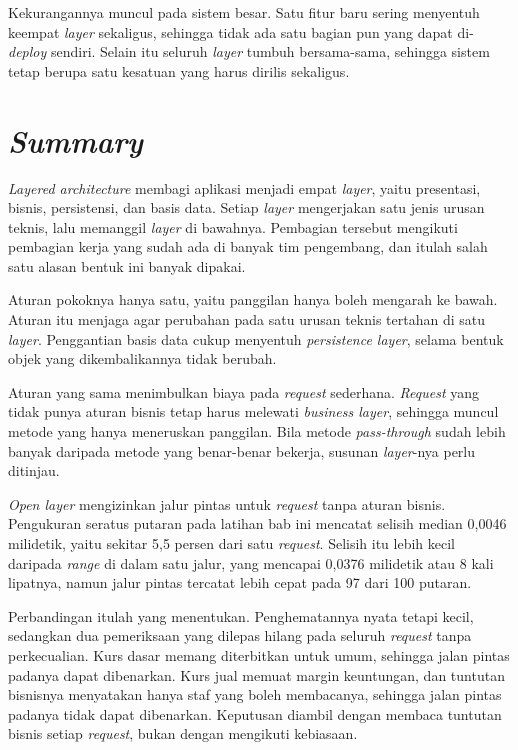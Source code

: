 Kekurangannya muncul pada sistem besar. Satu fitur baru sering menyentuh
keempat \textit{layer} sekaligus, sehingga tidak ada satu bagian pun yang dapat
di-\textit{deploy} sendiri. Selain itu seluruh \textit{layer} tumbuh bersama-sama,
sehingga sistem tetap berupa satu kesatuan yang harus dirilis sekaligus.

\section{\textit{Summary}}

\textit{Layered architecture} membagi aplikasi menjadi empat \textit{layer}, yaitu
presentasi, bisnis, persistensi, dan basis data. Setiap \textit{layer} mengerjakan satu
jenis urusan teknis, lalu memanggil \textit{layer} di bawahnya. Pembagian tersebut
mengikuti pembagian kerja yang sudah ada di banyak tim pengembang, dan itulah
salah satu alasan bentuk ini banyak dipakai.

Aturan pokoknya hanya satu, yaitu panggilan hanya boleh mengarah ke bawah.
Aturan itu menjaga agar perubahan pada satu urusan teknis tertahan di satu
\textit{layer}. Penggantian basis data cukup menyentuh \textit{persistence layer}, selama
bentuk objek yang dikembalikannya tidak berubah.

Aturan yang sama menimbulkan biaya pada \textit{request} sederhana. \textit{Request} yang
tidak punya aturan bisnis tetap harus melewati \textit{business layer}, sehingga muncul
metode yang hanya meneruskan panggilan. Bila metode \textit{pass-through} sudah
lebih banyak daripada metode yang benar-benar bekerja, susunan \textit{layer}-nya perlu
ditinjau.

\textit{Open layer} mengizinkan jalur pintas untuk \textit{request} tanpa aturan bisnis.
Pengukuran seratus putaran pada latihan bab ini mencatat selisih median
0,0046 milidetik, yaitu sekitar 5,5 persen dari satu \textit{request}. Selisih itu
lebih kecil daripada \textit{range} di dalam satu jalur, yang mencapai 0,0376
milidetik atau 8 kali lipatnya, namun jalur pintas tercatat lebih cepat pada 97
dari 100 putaran.

Perbandingan itulah yang menentukan. Penghematannya nyata tetapi kecil,
sedangkan dua pemeriksaan yang dilepas hilang pada seluruh \textit{request} tanpa
perkecualian. Kurs dasar memang diterbitkan untuk umum, sehingga jalan
pintas padanya dapat dibenarkan. Kurs jual memuat margin keuntungan, dan
tuntutan bisnisnya menyatakan hanya staf yang boleh membacanya, sehingga jalan
pintas padanya tidak dapat dibenarkan. Keputusan diambil dengan membaca tuntutan
bisnis setiap \textit{request}, bukan dengan mengikuti kebiasaan.


